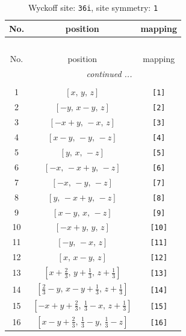 \documentclass[fleqn,8pt]{jsarticle}
\begin{document}
\renewcommand{\arraystretch}{1.2}
\begin{longtable}{ccc}
\caption{Wyckoff site: {\tt 36i}, site symmetry: {\tt 1}}
 \\
 \hline \hline
No. & position & mapping \\ \hline \endfirsthead

\multicolumn{2}{l}{\tablename\ \thetable{}} \\
 \hline \hline
No. & position & mapping \\ \hline \endhead

 \hline \hline
\multicolumn{2}{r}{\footnotesize\it continued ...} \\ \endfoot

 \hline \hline
\multicolumn{2}{r}{} \\ \endlastfoot

1 & $\left[ x,\, y,\, z \right]$ & {\tt [1]} \\ \hline
2 & $\left[ - y,\, x - y,\, z \right]$ & {\tt [2]} \\ \hline
3 & $\left[ - x + y,\, - x,\, z \right]$ & {\tt [3]} \\ \hline
4 & $\left[ x - y,\, - y,\, - z \right]$ & {\tt [4]} \\ \hline
5 & $\left[ y,\, x,\, - z \right]$ & {\tt [5]} \\ \hline
6 & $\left[ - x,\, - x + y,\, - z \right]$ & {\tt [6]} \\ \hline
7 & $\left[ - x,\, - y,\, - z \right]$ & {\tt [7]} \\ \hline
8 & $\left[ y,\, - x + y,\, - z \right]$ & {\tt [8]} \\ \hline
9 & $\left[ x - y,\, x,\, - z \right]$ & {\tt [9]} \\ \hline
10 & $\left[ - x + y,\, y,\, z \right]$ & {\tt [10]} \\ \hline
11 & $\left[ - y,\, - x,\, z \right]$ & {\tt [11]} \\ \hline
12 & $\left[ x,\, x - y,\, z \right]$ & {\tt [12]} \\ \hline
13 & $\left[ x + \frac{2}{3},\, y + \frac{1}{3},\, z + \frac{1}{3} \right]$ & {\tt [13]} \\ \hline
14 & $\left[ \frac{2}{3} - y,\, x - y + \frac{1}{3},\, z + \frac{1}{3} \right]$ & {\tt [14]} \\ \hline
15 & $\left[ - x + y + \frac{2}{3},\, \frac{1}{3} - x,\, z + \frac{1}{3} \right]$ & {\tt [15]} \\ \hline
16 & $\left[ x - y + \frac{2}{3},\, \frac{1}{3} - y,\, \frac{1}{3} - z \right]$ & {\tt [16]} \\ \hline

\end{longtable}
\end{document}

